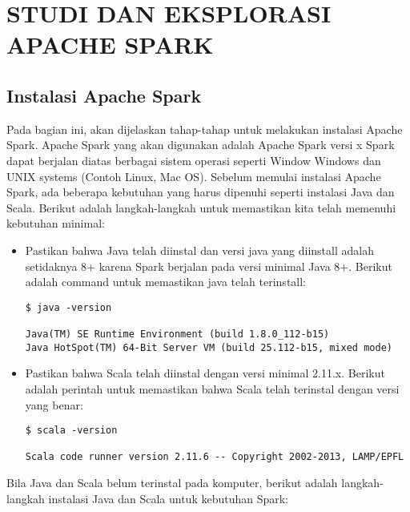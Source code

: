 \chapter{STUDI DAN EKSPLORASI APACHE SPARK}
\label{chap:studi dan eksplorasi}

\section{Instalasi Apache Spark}

Pada bagian ini, akan dijelaskan tahap-tahap untuk melakukan instalasi Apache Spark. Apache Spark yang akan digunakan adalah Apache Spark versi x Spark dapat berjalan diatas berbagai sistem operasi seperti Window Windows dan UNIX systems (Contoh Linux, Mac OS). Sebelum memulai instalasi Apache Spark, ada beberapa kebutuhan yang harus dipenuhi seperti instalasi Java dan Scala. Berikut adalah langkah-langkah untuk memastikan kita telah memenuhi kebutuhan minimal:

\begin{itemize}

\item Pastikan bahwa Java telah diinstal dan versi java yang diinstall adalah setidaknya 8+ karena Spark berjalan pada versi minimal Java 8+. Berikut adalah command untuk memastikan java telah terinstall:

\begin{verbatim}
$ java -version

Java(TM) SE Runtime Environment (build 1.8.0_112-b15)                                                                   Java HotSpot(TM) 64-Bit Server VM (build 25.112-b15, mixed mode) 
\end{verbatim}


\item Pastikan bahwa Scala telah diinstal dengan versi minimal 2.11.x. Berikut adalah perintah untuk memastikan bahwa Scala telah terinstal dengan versi yang benar:

\begin{verbatim}
$ scala -version

Scala code runner version 2.11.6 -- Copyright 2002-2013, LAMP/EPFL
\end{verbatim}

\end{itemize} 

Bila Java dan Scala belum terinstal pada komputer, berikut adalah langkah-langkah instalasi Java dan Scala untuk kebutuhan Spark:


